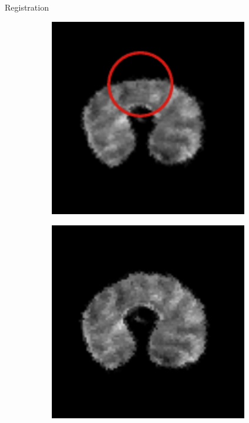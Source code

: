 \documentclass[10pt]{beamer}
\begin{document}
\begin{frame}{Registration}
\begin{figure}[ht]
\begin{subfigure}[t]{0.25\textwidth}
    \caption{}
    \label{subfig:registration_wheat_affine}
  \end{subfigure}%
  \begin{subfigure}[t]{0.25\textwidth}
    \centering
    \includegraphics[width=0.95\textwidth]{fig/registration_wheat_ssd}
    \caption{}
    \label{subfig:registration_wheat_ssd}
  \end{subfigure}%
  \begin{subfigure}[t]{0.25\textwidth}
    \centering
    \includegraphics[width=0.95\textwidth]{fig/registration_wheat_dtssd}
    \caption{}
    \label{subfig:registration_wheat_dtssd}
  \end{subfigure}%
\end{figure}
\end{frame}
\end{document}
